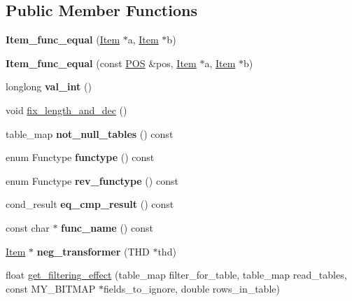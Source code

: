 \subsection*{Public Member Functions}
\begin{DoxyCompactItemize}
\item 
\mbox{\label{classItem__func__equal_abd190fdc3fa2e46a37a3bac0ec7a7799}} 
{\bfseries Item\+\_\+func\+\_\+equal} (\mbox{\hyperlink{classItem}{Item}} $\ast$a, \mbox{\hyperlink{classItem}{Item}} $\ast$b)
\item 
\mbox{\label{classItem__func__equal_af8736e2d6b30758f6412181f4de6a19d}} 
{\bfseries Item\+\_\+func\+\_\+equal} (const \mbox{\hyperlink{structYYLTYPE}{P\+OS}} \&pos, \mbox{\hyperlink{classItem}{Item}} $\ast$a, \mbox{\hyperlink{classItem}{Item}} $\ast$b)
\item 
\mbox{\label{classItem__func__equal_a2c2a967d3148e496222654eca6b6e37a}} 
longlong {\bfseries val\+\_\+int} ()
\item 
void \mbox{\hyperlink{classItem__func__equal_a3fe9df49488e4bb555010012b878b499}{fix\+\_\+length\+\_\+and\+\_\+dec}} ()
\item 
\mbox{\label{classItem__func__equal_a5fbf9eeef8db0f241dcf05159fbc12bc}} 
table\+\_\+map {\bfseries not\+\_\+null\+\_\+tables} () const
\item 
\mbox{\label{classItem__func__equal_a84365d55a5b3f7d49374a4af2d83c666}} 
enum Functype {\bfseries functype} () const
\item 
\mbox{\label{classItem__func__equal_acea6a13cd6dd290f04ecbbf0f6c8d475}} 
enum Functype {\bfseries rev\+\_\+functype} () const
\item 
\mbox{\label{classItem__func__equal_ae6f5ad5c90cfe33300d08882e7e117bb}} 
cond\+\_\+result {\bfseries eq\+\_\+cmp\+\_\+result} () const
\item 
\mbox{\label{classItem__func__equal_aad33d7efac61ad5f41496c3e0a86aeb2}} 
const char $\ast$ {\bfseries func\+\_\+name} () const
\item 
\mbox{\label{classItem__func__equal_a1e9f169ef34840acc2d0f33f0bd9aa9a}} 
\mbox{\hyperlink{classItem}{Item}} $\ast$ {\bfseries neg\+\_\+transformer} (T\+HD $\ast$thd)
\item 
float \mbox{\hyperlink{classItem__func__equal_ac9f18925664d02a73530813c3c2f2710}{get\+\_\+filtering\+\_\+effect}} (table\+\_\+map filter\+\_\+for\+\_\+table, table\+\_\+map read\+\_\+tables, const M\+Y\+\_\+\+B\+I\+T\+M\+AP $\ast$fields\+\_\+to\+\_\+ignore, double rows\+\_\+in\+\_\+table)
\end{DoxyCompactItemize}
